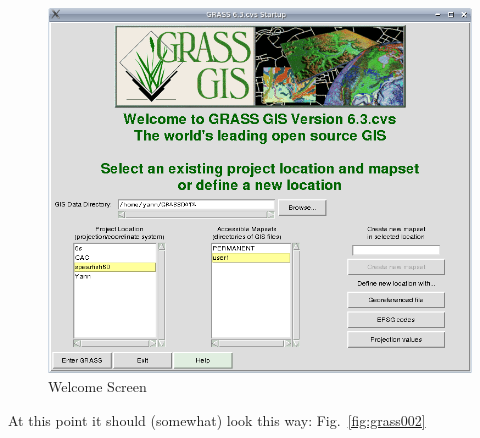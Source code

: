 \begin{figure}[htbp]
   \centering
   \includegraphics[scale=0.3]{grass001.png}
   \caption{Welcome Screen}
   \label{fig:grass001}
\end{figure}

At this point it should (somewhat) look this way: Fig.~\ref{fig:grass002}

